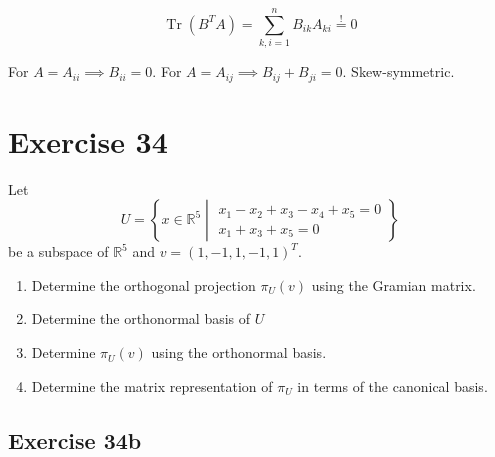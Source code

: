 \documentclass[a4paper]{article}
\theoremstyle{definition}
\DeclareMathOperator\Tr{Tr}
\newcommand\set[1]{\left\{#1\right\}}
\begin{document}
\[ \Tr(B^T A) = \sum_{k,i=1}^n B_{ik} A_{ki} \overset!= 0 \]

For $A = A_{ii} \implies B_{ii} = 0$.
For $A = A_{ij} \implies B_{ij} + B_{ji} = 0$.
Skew-symmetric.

\section*{Exercise 34}
\begin{ex}
  Let
  \[ U = \set{x \in \mathbb R^5 \middle| \substack{x_1 - x_2 + x_3 - x_4 + x_5 = 0 \\ x_1 + x_3 + x_5 = 0}} \]
  be a subspace of $\mathbb R^5$ and $v = (1,-1,1,-1,1)^T$.
  \begin{enumerate}
    \item Determine the orthogonal projection $\pi_U(v)$ using the Gramian matrix.
    \item Determine the orthonormal basis of $U$
    \item Determine $\pi_U(v)$ using the orthonormal basis.
    \item Determine the matrix representation of $\pi_U$ in terms of the canonical basis.
  \end{enumerate}
\end{ex}

\subsection{Exercise 34b}
\end{document}
